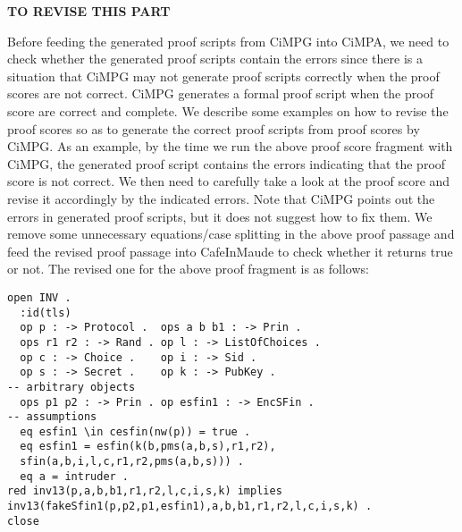 \documentclass[a4paper,fleqn]{cas-dc}
\begin{document}
\textbf{TO REVISE THIS PART}






Before feeding the generated proof scripts from CiMPG into CiMPA, we need to check whether the generated proof scripts contain the errors since there is a situation that CiMPG may not generate proof scripts correctly when the proof scores are not correct. CiMPG generates a formal proof script when the proof score are correct and complete. We describe some examples on how to revise the proof scores so as to generate the correct proof scripts from proof scores by CiMPG. As an example, by the time we run the above proof score fragment with CiMPG, the generated proof script contains the errors indicating that the proof score is not correct. We then need to carefully take a look at the proof score and revise it accordingly by the indicated errors. Note that CiMPG points out the errors in generated proof scripts, but it does not suggest how to fix them. We remove some unnecessary equations/case splitting in the above proof passage and feed the revised proof passage into CafeInMaude to check whether it returns true or not. The revised one for the above proof fragment is as follows:
\begin{small}
\begin{verbatim}
open INV .
  :id(tls)
  op p : -> Protocol .  ops a b b1 : -> Prin .
  ops r1 r2 : -> Rand . op l : -> ListOfChoices .
  op c : -> Choice .    op i : -> Sid .
  op s : -> Secret .    op k : -> PubKey .
-- arbitrary objects
  ops p1 p2 : -> Prin . op esfin1 : -> EncSFin .
-- assumptions
  eq esfin1 \in cesfin(nw(p)) = true .
  eq esfin1 = esfin(k(b,pms(a,b,s),r1,r2),
  sfin(a,b,i,l,c,r1,r2,pms(a,b,s))) .
  eq a = intruder .
red inv13(p,a,b,b1,r1,r2,l,c,i,s,k) implies
inv13(fakeSfin1(p,p2,p1,esfin1),a,b,b1,r1,r2,l,c,i,s,k) .
close
\end{verbatim}
\end{small}
\end{document}
